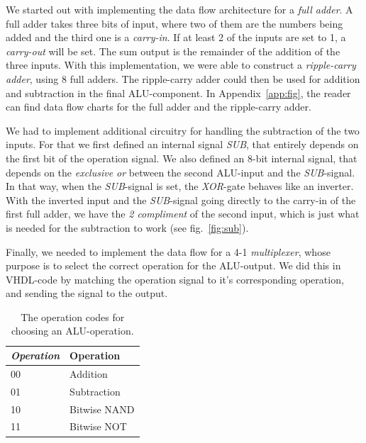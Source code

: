 \documentclass[a4,11pt]{article}
\begin{document}
We started out with implementing the data flow architecture for a
{\it full adder}. A full adder takes three bits of input, where two of them are the numbers being
added and the third one is a {\it carry-in}. If at least 2 of the inputs are set to 1, a {\it
carry-out} will be set. The sum output is the remainder of the addition of the three inputs. With
this implementation, we were able to construct a {\it ripple-carry adder}, using 8 full adders.
The ripple-carry adder could then be used for addition and subtraction in the final ALU-component.
In Appendix~\ref{app:fig}, the reader can find data flow charts for the full adder and the
ripple-carry adder.

We had to implement additional circuitry for handling the subtraction of the two inputs. For
that we first defined an internal signal {\it SUB}, that entirely depends on the first bit of the
operation signal. We also defined an 8-bit internal signal, that depends on the {\it exclusive
or} between the second ALU-input and the {\it SUB}-signal. In that way, when the {\it SUB}-signal
is set, the {\it XOR}-gate behaves like an inverter. With the inverted input and the {\it SUB}-signal
going directly to the carry-in of the first full adder, we have the {\it 2 compliment} of the second
input, which is just what is needed for the subtraction to work (see fig.~\ref{fig:sub}).

Finally, we needed to implement the data flow for a 4-1 {\it multiplexer}, whose purpose is to
select the correct operation for the ALU-output. We did this in VHDL-code by matching the operation
signal to it's corresponding operation, and sending the signal to the output.

\begin{table}   
	\centering
	\small
	\def\arraystretch{1.1}              
	\begin{tabular}{|l|l|}
		\hline
		{\it Operation} & {\bf Operation} \\ \hline
		00              & Addition        \\ 
		01              & Subtraction     \\
		10              & Bitwise NAND    \\ 
		11              & Bitwise NOT     \\ \hline
	\end{tabular}
	\caption{The operation codes for choosing an ALU-operation.}
	\label{tab:op}
\end{table}
\end{document}
